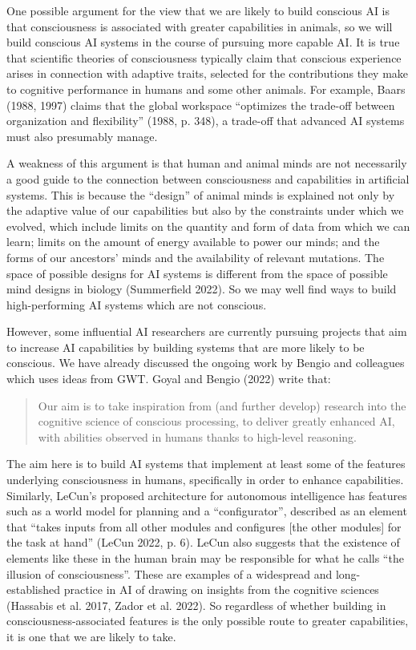 \documentclass[12pt]{article}
\newenvironment{myquote}
  {\begin{quote}\leftskip=1cm\rightskip=1cm}
  {\end{quote}}
\begin{document}
One possible argument for the view that we are likely to build conscious AI is that consciousness is associated with greater capabilities in animals, so we will build conscious AI systems in the course of pursuing more capable AI. It is true that scientific theories of consciousness typically claim that conscious experience arises in connection with adaptive traits, selected for the contributions they make to cognitive performance in humans and some other animals. For example, Baars (1988, 1997) claims that the global workspace ``optimizes the trade-off between organization and flexibility'' (1988, p. 348), a trade-off that advanced AI systems must also presumably manage.

A weakness of this argument is that human and animal minds are not necessarily a good guide to the connection between consciousness and capabilities in artificial systems. This is because the ``design'' of animal minds is explained not only by the adaptive value of our capabilities but also by the constraints under which we evolved, which include limits on the quantity and form of data from which we can learn; limits on the amount of energy available to power our minds; and the forms of our ancestors’ minds and the availability of relevant mutations. The space of possible designs for AI systems is different from the space of possible mind designs in biology (Summerfield 2022). So we may well find ways to build high-performing AI systems which are not conscious.

However, some influential AI researchers are currently pursuing projects that aim to increase AI capabilities by building systems that are more likely to be conscious. We have already discussed the ongoing work by Bengio and colleagues which uses ideas from GWT. Goyal and Bengio (2022) write that:

\begin{myquote}
Our aim is to take inspiration from (and further develop) research into the cognitive science of conscious processing, to deliver greatly enhanced AI, with abilities observed in humans thanks to high-level reasoning.
\end{myquote}

The aim here is to build AI systems that implement at least some of the features underlying consciousness in humans, specifically in order to enhance capabilities. Similarly, LeCun’s proposed architecture for autonomous intelligence has features such as a world model for planning and a ``configurator'', described as an element that ``takes inputs from all other modules and configures [the other modules] for the task at hand'' (LeCun 2022, p. 6). LeCun also suggests that the existence of elements like these in the human brain may be responsible for what he calls ``the illusion of consciousness''. These are examples of a widespread and long-established practice in AI of drawing on insights from the cognitive sciences (Hassabis et al. 2017, Zador et al. 2022). So regardless of whether building in consciousness-associated features is the only possible route to greater capabilities, it is one that we are likely to take.
\end{document}
